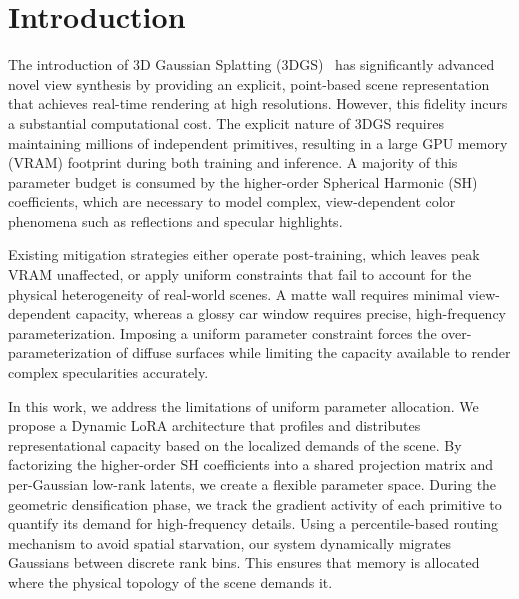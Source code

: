 \documentclass[sigconf]{acmart}
\begin{document}


\maketitle
\section{Introduction}
\label{sec:introduction}
The introduction of 3D Gaussian Splatting (3DGS)~\cite{kerbl2023} has significantly 
advanced novel view synthesis by providing an explicit, point-based scene 
representation that achieves real-time rendering at high resolutions. However, 
this fidelity incurs a substantial computational cost. The explicit nature of 
3DGS requires maintaining millions of independent primitives, resulting in a 
large GPU memory (VRAM) footprint during both training and inference. A 
majority of this parameter budget is consumed by the higher-order Spherical 
Harmonic (SH) coefficients, which are necessary to model complex, 
view-dependent color phenomena such as reflections and specular highlights. 

Existing mitigation strategies either operate post-training, which leaves peak 
VRAM unaffected, or apply uniform constraints that fail to account for the 
physical heterogeneity of real-world scenes. 
A matte wall requires minimal view-dependent capacity, 
whereas a glossy car window requires precise, high-frequency parameterization. 
Imposing a uniform parameter constraint forces the over-parameterization of 
diffuse surfaces while limiting the capacity available to render complex specularities accurately.

In this work, we address the limitations of uniform parameter allocation. We 
propose a Dynamic LoRA architecture that profiles and distributes 
representational capacity based on the localized demands of the scene. By 
factorizing the higher-order SH coefficients into a shared projection matrix 
and per-Gaussian low-rank latents, we create a flexible parameter space. 
During the geometric densification phase, we track the gradient activity of each 
primitive to quantify its demand for high-frequency details. Using a 
percentile-based routing mechanism to avoid spatial starvation, our system 
dynamically migrates Gaussians between discrete rank bins. This ensures that 
memory is allocated where the physical topology of the scene demands it.
\end{document}
